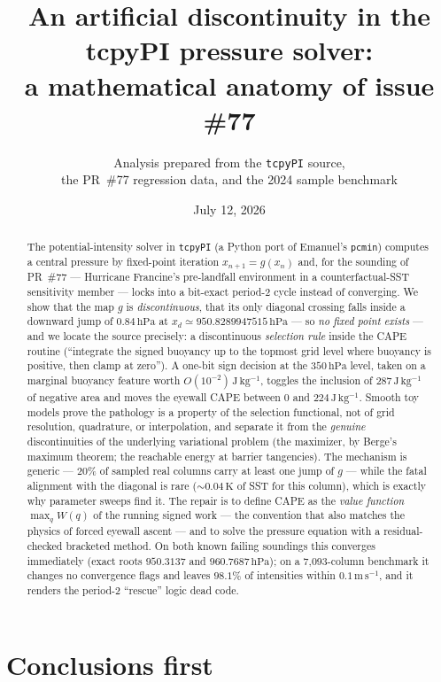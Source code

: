\documentclass[11pt,a4paper]{article}
\title{An artificial discontinuity in the tcpyPI pressure solver:\\
a mathematical anatomy of issue \#77}
\author{Analysis prepared from the \texttt{tcpyPI} source,\\
the PR~\#77 regression data, and the 2024 sample benchmark}
\date{July 12, 2026}
\theoremstyle{definition}
\newcommand{\hPa}{\,\mathrm{hPa}}
\newcommand{\Jkg}{\,\mathrm{J\,kg^{-1}}}
\newcommand{\K}{\,\mathrm{K}}
\newcommand{\ms}{\,\mathrm{m\,s^{-1}}}
\begin{document}
\maketitle

\begin{abstract}
\noindent
The potential-intensity solver in \texttt{tcpyPI} (a Python port of Emanuel's
\texttt{pcmin}) computes a central pressure by fixed-point iteration
$x_{n+1}=g(x_n)$ and, for the sounding of PR~\#77 --- Hurricane Francine's
pre-landfall environment in a counterfactual-SST sensitivity member --- locks
into a bit-exact period-2 cycle instead of converging.  We show that the map
$g$ is \emph{discontinuous}, that its only diagonal crossing falls inside a
downward jump of $0.84\hPa$ at $x_d\simeq950.8289947515\hPa$ --- so
\emph{no fixed point exists} --- and we locate the source precisely: a
discontinuous \emph{selection rule} inside the CAPE routine (``integrate the
signed buoyancy up to the topmost grid level where buoyancy is positive, then
clamp at zero'').  A one-bit sign decision at the $350\hPa$ level, taken on a
marginal buoyancy feature worth $O(10^{-2})\Jkg$, toggles the inclusion of
$287\Jkg$ of negative area and moves the eyewall CAPE between $0$ and
$224\Jkg$.  Smooth toy models prove the pathology is a property of the
selection functional, not of grid resolution, quadrature, or interpolation,
and separate it from the \emph{genuine} discontinuities of the underlying
variational problem (the maximizer, by Berge's maximum theorem; the reachable
energy at barrier tangencies).  The mechanism is generic --- $20\%$ of
sampled real columns carry at least one jump of $g$ --- while the fatal
alignment with the diagonal is rare ($\sim0.04\K$ of SST for this column),
which is exactly why parameter sweeps find it.  The repair is to define CAPE
as the \emph{value function} $\max_q W(q)$ of the running signed work --- the
convention that also matches the physics of forced eyewall ascent --- and to
solve the pressure equation with a residual-checked bracketed method.  On
both known failing soundings this converges immediately (exact roots
$950.3137$ and $960.7687\hPa$); on a 7{,}093-column benchmark it changes no
convergence flags and leaves $98.1\%$ of intensities within $0.1\ms$, and it
renders the period-2 ``rescue'' logic dead code.
\end{abstract}

\tableofcontents

\section{Conclusions first}\label{sec:conclusions}
\end{document}
